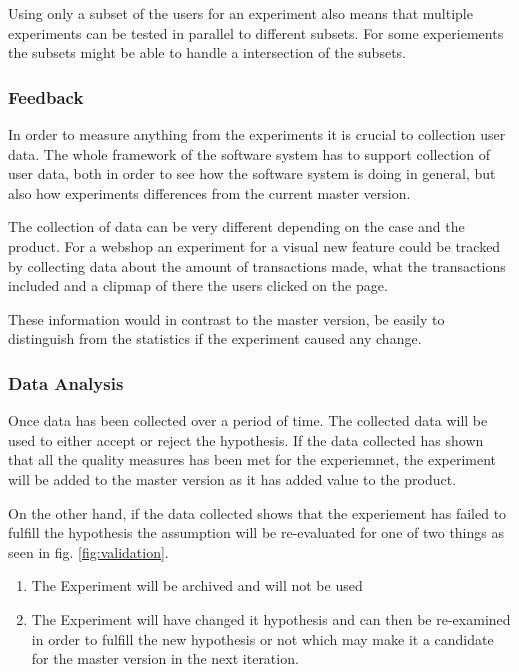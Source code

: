 \documentclass{sig-alternate}
\begin{document}
Using only a subset of the users for an experiment also means that multiple experiments can be tested in 
parallel to different subsets. For some experiements the subsets might be able to handle a intersection of 
the subsets. 

\subsubsection{Feedback}
\label{cx:feedback}
In order to measure anything from the experiments it is crucial to collection user data.
The whole framework of the software system has to support collection of user data, both in order to see how 
the software system is doing in general, but also how experiments differences from the current master version.

The collection of data can be very different depending on the case and the product. 
For a webshop an experiment for a visual new feature could be tracked by collecting data about the amount 
of transactions made, what the transactions included and a clipmap of there the users clicked on the page.

These information would in contrast to the master version, be easily to distinguish from the statistics if 
the experiment caused any change.

\subsubsection{Data Analysis}
\label{cx:analyse}
Once data has been collected over a period of time. The collected data will be used to either accept or reject
the hypothesis. 
If the data collected has shown that all the quality measures has been met for the experiemnet, 
the experiment will be added to the master version as it has added value to the product.

On the other hand, if the data collected shows that the experiement has failed to fulfill the hypothesis 
the assumption will be re-evaluated for one of two things as seen in fig. \ref{fig:validation}. 
\begin{enumerate}
\item The Experiment will be archived and will not be used
\item The Experiment will have changed it hypothesis and can then be re-examined in order to fulfill the new 
hypothesis or not which may make it a candidate for the master version in the next iteration.
\end{enumerate}
\end{document}
